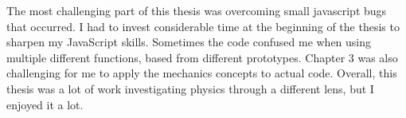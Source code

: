 The most challenging part of this thesis was overcoming small javascript bugs that occurred.  I had to invest considerable time at the beginning of the thesis to sharpen my JavaScript skills.  Sometimes the code confused me when using multiple different functions, based from different prototypes.  Chapter 3 was also challenging for me to apply the mechanics concepts to actual code.  Overall, this thesis was a lot of work investigating physics through a different lens, but I enjoyed it a lot.


































